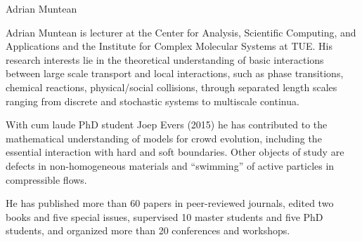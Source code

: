 \begin{participant}[type=R,PM=12,gender=male,salary=5500]{Adrian Muntean}


Adrian Muntean is lecturer at the Center for Analysis, Scientific Computing, and Applications and the Institute for Complex Molecular Systems at TUE. His research interests lie in 
the theoretical understanding of basic interactions between large scale transport and local interactions, such as phase transitions, chemical reactions, physical/social collisions, through separated length scales ranging from discrete and stochastic systems to multiscale continua. 

With cum laude PhD student Joep Evers (2015) he has contributed to the mathematical  understanding of models for crowd evolution, including the essential interaction with hard and soft boundaries. Other objects of study are defects in non-homogeneous materials and ``swimming'' of active particles in compressible flows.

He has published more than 60 papers in peer-reviewed journals, edited two books and five special issues, supervised 10 master students and five PhD students, and organized more than 20 conferences and workshops. 

\end{participant}

